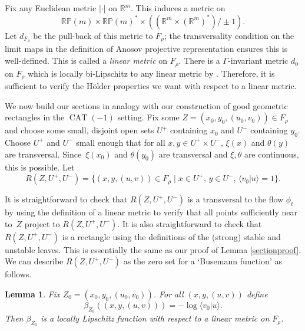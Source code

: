 \documentclass[11pt]{article}
\let\sep\mid
\newtheorem{lem}[thm]{Lemma}
\theoremstyle{definition}
\numberwithin{equation}{section}
\DeclareMathOperator{\CAT}{CAT}
\begin{document}
Fix any Euclidean metric $|\cdot|$ on $\mathbb{R}^m$. This induces a metric on\vspace*{-3pt}\enlargethispage{\baselineskip}%
\[ \mathbb{RP}(m) \times \mathbb{RP}(m)^* \times ((\mathbb{R}^m \times (\mathbb{R}^m)^*)/\pm1).\]
Let $d_{F_\rho}$ be the pull-back of this metric to $F_\rho$; the transversality condition on the limit maps in the definition of Anosov projective representation ensures this is well-defined. This is called a \emph{linear metric} on $F_\rho$. There is a $\Gamma$-invariant metric $d_0$ on $F_\rho$ which is locally bi-Lipschitz to any linear metric by \cite[Lem.\,5.2]{bcls}. Therefore, it is sufficient to verify the Hölder properties we want with respect to a linear metric.

We now build our sections in analogy with our construction of good geometric rectangles in the $\CAT(-1)$ setting. Fix some $Z = (x_0,y_0,(u_0,v_0)) \in F_\rho$ and choose some small, disjoint open sets $U^+$ containing $x_0$ and $U^-$ containing $y_0$. Choose $U^+$ and $U^-$ small enough that for all $x,y\in U^+\times U^-$, $\xi(x)$ and $\theta(y)$ are transversal. Since~$\xi(x_0)$ and $\theta(y_0)$ are transversal and $\xi, \theta$ are continuous, this is possible.
Let
\[ R(Z,U^+,U^-) = \{ (x,y,(u,v))\in F_\rho \sep x\in U^+,\, y\in U^-,\, \langle v_0 | u \rangle =1\}.\]

It is straightforward to check that $R(Z,U^+,U^-)$ is a transversal to the flow $\phi_t$ by using the definition of a linear metric to verify that all points sufficiently near to~$Z$ project to $R(Z,U^+,U^-)$. It is also straightforward to check that $R(Z,U^+,U^-)$ is a rectangle using the definitions of the (strong) stable and unstable leaves. This is essentially the same as our proof of Lemma \ref{sectionproof}. We can describe $R(Z,U^+,U^-)$ as the zero set for a `Busemann function' as follows.

\begin{lem}\label{lem:beta Lipschitz}
Fix $Z_0=(x_0,y_0,(u_0,v_0))$. For all $(x,y,(u,v))$ define\vspace*{-3pt}
\[ \beta_{Z_0}((x,y,(u,v))) = -\log\langle v_0 | u\rangle.\]
Then $\beta_{Z_0}$ is a locally Lipschitz function with respect to a linear metric on $F_\rho$.
\end{lem}
\end{document}
